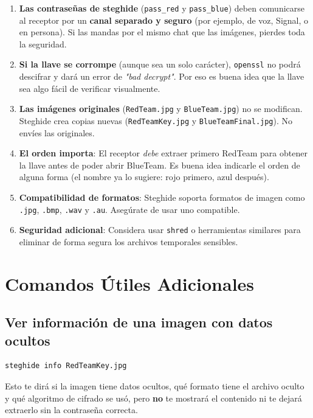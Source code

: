 \documentclass[11pt,a4paper]{article}
\begin{document}
\begin{enumerate}
    \item \textbf{Las contraseñas de steghide} (\texttt{pass\_red} y \texttt{pass\_blue}) deben comunicarse al receptor por un \textbf{canal separado y seguro} (por ejemplo, de voz, Signal, o en persona). Si las mandas por el mismo chat que las imágenes, pierdes toda la seguridad.

    \item \textbf{Si la llave se corrompe} (aunque sea un solo carácter), \texttt{openssl} no podrá descifrar y dará un error de \textit{"bad decrypt"}. Por eso es buena idea que la llave sea algo fácil de verificar visualmente.

    \item \textbf{Las imágenes originales} (\texttt{RedTeam.jpg} y \texttt{BlueTeam.jpg}) no se modifican. Steghide crea copias nuevas (\texttt{RedTeamKey.jpg} y \texttt{BlueTeamFinal.jpg}). No envíes las originales.

    \item \textbf{El orden importa}: El receptor \textit{debe} extraer primero RedTeam para obtener la llave antes de poder abrir BlueTeam. Es buena idea indicarle el orden de alguna forma (el nombre ya lo sugiere: rojo primero, azul después).

    \item \textbf{Compatibilidad de formatos}: Steghide soporta formatos de imagen como \texttt{.jpg}, \texttt{.bmp}, \texttt{.wav} y \texttt{.au}. Asegúrate de usar uno compatible.

    \item \textbf{Seguridad adicional}: Considera usar \texttt{shred} o herramientas similares para eliminar de forma segura los archivos temporales sensibles.
\end{enumerate}

\section{Comandos Útiles Adicionales}

\subsection{Ver información de una imagen con datos ocultos}
\begin{lstlisting}[language=bash]
steghide info RedTeamKey.jpg
\end{lstlisting}

Esto te dirá si la imagen tiene datos ocultos, qué formato tiene el archivo oculto y qué algoritmo de cifrado se usó, pero \textbf{no} te mostrará el contenido ni te dejará extraerlo sin la contraseña correcta.
\end{document}
